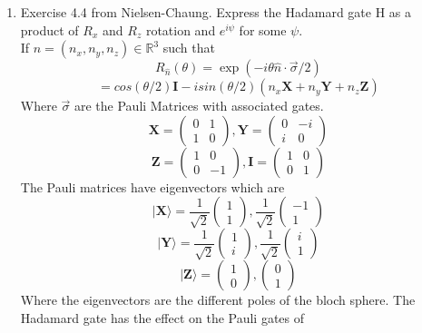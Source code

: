 \documentclass[12pt]{article}
\newcommand{\ket}[1]{\vert{#1}\rangle}
\begin{document}
\begin{enumerate}
    \item Exercise 4.4 from Nielsen-Chaung. Express the Hadamard gate H as a product of $R_x$ and $R_z$ rotation and $e^{i \psi}$ for some $\psi$. 
    \\
    If $\hat{n} = (n_x, n_y, n_z) \in \mathbb{R}^3$ such that 
    $$ R_{\hat{n}} (\theta) = \exp (-i \theta \hat{n} \cdot \vec{\sigma}/2) $$
    $$ = cos(\theta /2)\textbf{I} - isin(\theta /2 )(n_x \textbf{X} + n_y \textbf{Y} + n_z \textbf{Z}) $$
    Where $\vec{\sigma}$ are the Pauli Matrices with associated gates. 
    $$  \textbf{X} = \left(\begin{array}{cc} 0 & 1 \\  1 & 0\end{array}\right), \textbf{Y} = \left(\begin{array}{cc} 0 & -i \\  i & 0\end{array}\right)$$
    $$ \textbf{Z} = \left(\begin{array}{cc} 1 & 0 \\  0 & -1\end{array}\right), \textbf{I} = \left(\begin{array}{cc} 1 & 0 \\  0 & 1\end{array}\right) $$
    The Pauli matrices have eigenvectors which are 
    $$ \ket{\textbf{X}} = \frac{1}{\sqrt{2}} \left(\begin{array}{cc} 1 \\  1\end{array}\right), \frac{1}{\sqrt{2}} \left(\begin{array}{cc} -1 \\  1\end{array}\right)$$
    $$ \ket{\textbf{Y}} = \frac{1}{\sqrt{2}} \left(\begin{array}{cc} 1 \\  i\end{array}\right), \frac{1}{\sqrt{2}} \left(\begin{array}{cc} i \\  1\end{array}\right)$$
    $$ \ket{\textbf{Z}} = \left(\begin{array}{cc} 1 \\  0\end{array}\right), \left(\begin{array}{cc} 0 \\  1\end{array}\right)$$
    Where the eigenvectors are the different poles of the bloch sphere. The Hadamard gate has the effect on the Pauli gates of 

\end{enumerate}
\end{document}
